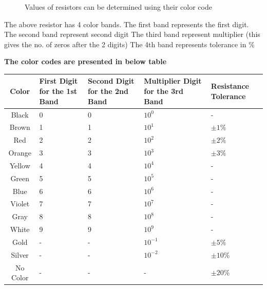 \begin{figure}[H]
    \centering
    
    \caption{Values of resistors can be determined using their color code}
    \label{fig:colorcode}
\end{figure}

\noindent The above resistor has 4 color bands. The first band represents the first digit. The second band represent second digit The third band represent multiplier (this gives the no. of zeros after the 2 digits) The 4th band represents tolerance in \% 

\vspace{1 cm}
\noindent \textbf{The color codes are presented in below table}

\begin{table}[H]
    \centering
    \renewcommand{\arraystretch}{1.2}
    \setlength{\tabcolsep}{8pt}
    
    \begin{tabular}{c| m{2.5cm} |m{2.5cm}|m{2.5cm}|m{2.5cm}}
    \hline
        Color & First Digit for the 1st Band &  Second Digit for the 2nd Band & Multiplier Digit for the 3rd Band & Resistance Tolerance\\
    \hline \hline    
        Black & 0 & 0 & $10^0$ & - \\
        Brown & 1 & 1 & $10^1$ & $\pm 1\%$\\
        Red & 2 & 2 & $10^2$  & $\pm 2\%$ \\
        Orange & 3 & 3 & $10^3$ & $\pm 3\%$ \\ 
        Yellow & 4 & 4 & $10^4$ & - \\ 
        Green & 5 & 5 & $10^5$ & - \\
        Blue & 6 & 6 & $10^6$ & - \\ 
        Violet & 7 & 7 & $10^7$ & - \\
        Gray & 8 & 8 & $10^8$ & - \\ 
        White & 9 & 9 & $10^9$ & - \\ 
        Gold & - & - & $10^{-1}$ & $\pm 5\%$ \\
        Silver & - & - & $10^{-2}$ & $\pm 10\%$ \\
        No Color & - & - & - & $\pm 20\%$ \\
        
    \hline 
    \end{tabular}

    \label{tab:my_label}
\end{table}

